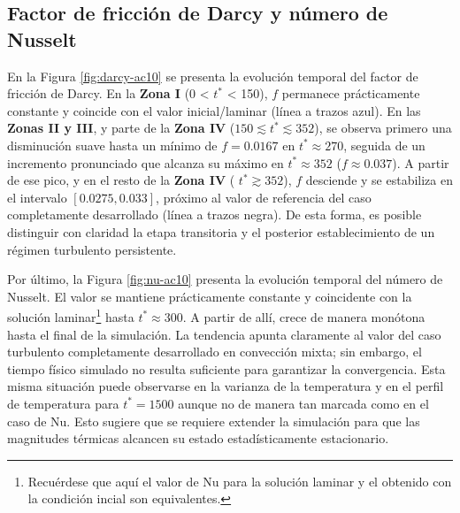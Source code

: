 \subsection{Factor de fricción de Darcy y número de Nusselt}
En la Figura \ref{fig:darcy-ac10} se presenta la evolución temporal del factor de fricción de Darcy. En la \textbf{Zona I} (0 < $t^*$ < 150), $f$ permanece prácticamente constante y coincide con el valor inicial/laminar (línea a trazos azul). En las \textbf{Zonas II y III}, y parte de la \textbf{Zona IV} ($150 \lesssim t^* \lesssim 352 $), se observa primero una disminución suave hasta un mínimo de $f=0.0167$ en $t^*\approx270$, seguida de un incremento pronunciado que alcanza su máximo en $t^*\approx352$ ($f \approx 0\text{.}037$). A partir de ese pico, y en el resto de la \textbf{Zona IV} ( $t^*\gtrsim352$), $f$ desciende y se estabiliza en el intervalo $\left[ 0\text{.}0275, 0\text{.}033 \right]$, próximo al valor de referencia del caso completamente desarrollado (línea a trazos negra). De esta forma, es posible distinguir con claridad la etapa transitoria y el posterior establecimiento de un régimen turbulento persistente.

Por último, la Figura \ref{fig:nu-ac10} presenta la evolución temporal del número de Nusselt. El valor se mantiene prácticamente constante y coincidente con la solución laminar\footnote{Recuérdese que aquí el valor de Nu para la solución laminar y el obtenido con la condición incial son equivalentes.} hasta $t^* \approx 300$. A partir de allí, crece de manera monótona hasta el final de la simulación. La tendencia apunta claramente al valor del caso turbulento completamente desarrollado en convección mixta; sin embargo, el tiempo físico simulado no resulta suficiente para garantizar la convergencia. Esta misma situación puede observarse en la varianza de la temperatura y en el perfil de temperatura para $t^*=1500$ aunque no de manera tan marcada como en el caso de Nu. Esto sugiere que se requiere extender la simulación para que las magnitudes térmicas alcancen su estado estadísticamente estacionario.

